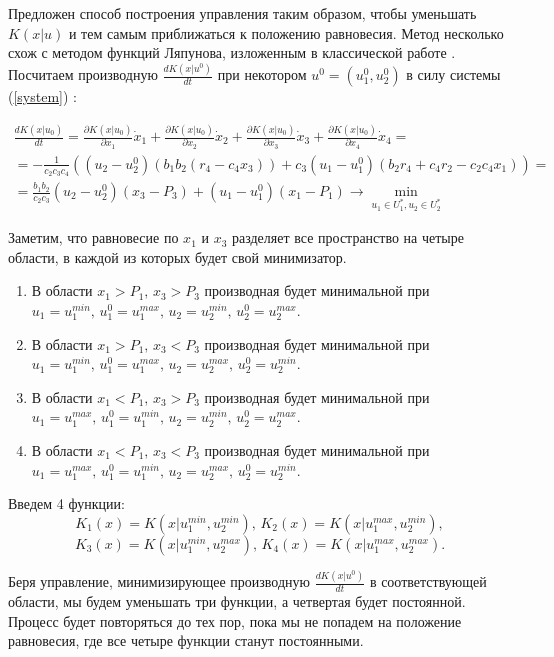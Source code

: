 \documentclass[11pt]{article}
\theoremstyle{definition}
\newcommand\Ref[1]{(\ref{#1})}
\newcommand\RS{\Ref{system} }
\newcommand\dd[2]{\frac{\partial#1}{\partial#2}}
\begin{document}
	Предложен способ построения управления таким образом, чтобы уменьшать $K(x|u)$ и тем самым приближаться к положению равновесия. Метод несколько схож с методом функций Ляпунова, изложенным в классической работе \cite{Lyapunov}. 
Посчитаем производную $\frac{dK(x|u^0)}{dt}$ при некотором $u^0 = (u_1^0, u_2^0)$ в силу системы \RS:

\begin{multline*}
    \frac{dK(x|u_0)}{dt} = \dd{K(x|u_0)}{x_1}\dot x_1 + \dd{K(x|u_0)}{x_2}\dot x_2 + \dd{K(x|u_0)}{x_3}\dot x_3 + \dd{K(x|u_0)}{x_4}\dot x_4 = \\
    = -\frac{1}{c_2c_3c_4}\left((u_2 - u_2^0)(b_1b_2(r_4 - c_4x_3)) + c_3(u_1 - u_1^0)(b_2r_4 + c_4r_2 - c_2c_4x_1)\right) = \\
    = \frac{b_1b_2}{c_2c_3}(u_2 - u_2^0)(x_3 - P_3) + (u_1 - u_1^0)(x_1 - P_1) \to \min\limits_{u_1 \in U_1^*, u_2 \in U_2^*}
\end{multline*}

Заметим, что равновесие по $x_1$ и $x_3$ разделяет все пространство на четыре области, в каждой из которых будет свой минимизатор.
\begin{enumerate}
\item
	В области $x_1 > P_1, \, x_3 > P_3$ производная будет минимальной при $u_1 = u_1^{min}, \, u_1^0 = u_1^{max}, \, u_2 = u_2^{min}, \, u_2^0 = u_2^{max}.$
\item
	В области $x_1 > P_1, \, x_3 < P_3$ производная будет минимальной при $u_1 = u_1^{min}, \, u_1^0 = u_1^{max}, \, u_2 = u_2^{max}, \, u_2^0 = u_2^{min}.$
\item
	В области $x_1 < P_1, \, x_3 > P_3$ производная будет минимальной при $u_1 = u_1^{max}, \, u_1^0 = u_1^{min}, \, u_2 = u_2^{min}, \, u_2^0 = u_2^{max}.$
\item
	В области $x_1 < P_1, \, x_3 < P_3$ производная будет минимальной при $u_1 = u_1^{max}, \, u_1^0 = u_1^{min}, \, u_2 = u_2^{max}, \, u_2^0 = u_2^{min}.$
\end{enumerate}

Введем 4 функции:
$$K_1(x) = K(x|u_1^{min}, u_2^{min}), \, K_2(x) = K(x|u_1^{max}, u_2^{min}),$$ 
$$K_3(x) = K(x|u_1^{min}, u_2^{max}), \, K_4(x) = K(x|u_1^{max}, u_2^{max}).$$

Беря управление, минимизирующее производную $\frac{dK(x|u^0)}{dt}$ в соответствующей области, мы будем уменьшать три функции, а четвертая будет постоянной. Процесс будет повторяться до тех пор, пока мы не попадем на положение равновесия, где все четыре функции станут постоянными. 
\end{document}
